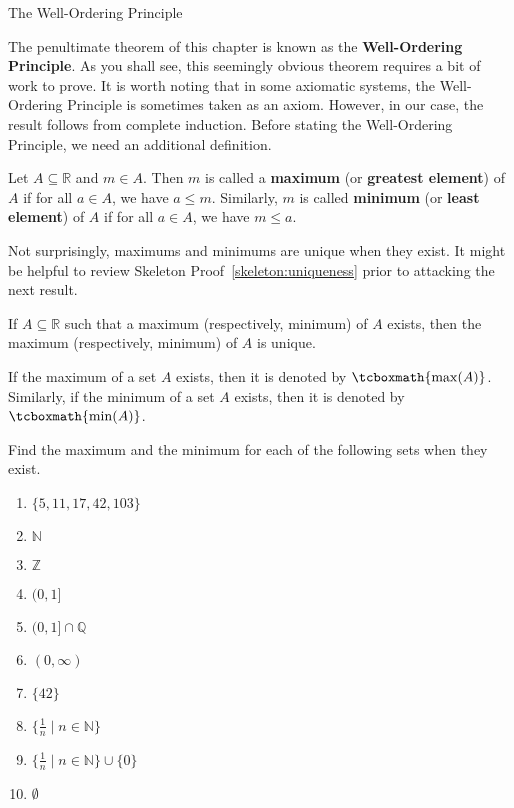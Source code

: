 \begin{section}{The Well-Ordering Principle}\label{sec:WOP}

The penultimate theorem of this chapter is known as the \textbf{Well-Ordering Principle}. As you shall see, this seemingly obvious theorem requires a bit of work to prove. It is worth noting that in some axiomatic systems, the Well-Ordering Principle is sometimes taken as an axiom.  However, in our case, the result follows from complete induction. Before stating the Well-Ordering Principle, we need an additional definition.

\begin{definition}
Let $A\subseteq \mathbb{R}$ and $m\in A$. Then $m$ is called a \textbf{maximum} (or \textbf{greatest element}) of $A$ if for all $a\in A$, we have $a\leq m$. Similarly, $m$ is called \textbf{minimum} (or \textbf{least element}) of $A$ if for all $a\in A$, we have $m\leq a$.
\end{definition}

Not surprisingly, maximums and minimums are unique when they exist. It might be helpful to review Skeleton Proof~\ref{skeleton:uniqueness} prior to attacking the next result.

\begin{theorem}
If $A\subseteq \mathbb{R}$ such that a maximum (respectively, minimum) of $A$ exists, then the maximum (respectively, minimum) of $A$ is unique.
\end{theorem}

If the maximum of a set $A$ exists, then it is denoted by $\tcboxmath{\max(A)}$. Similarly, if the minimum of a set $A$ exists, then it is denoted by $\tcboxmath{\min(A)}$.

\begin{problem}\label{prob:find max and min}
Find the maximum and the minimum for each of the following sets when they exist.
\begin{enumerate}[label=\textrm{(\alph*)}]
\item $\{5,11,17,42,103\}$ 
\item $\mathbb{N}$
\item $\mathbb{Z}$
\item $(0,1]$
\item $(0,1]\cap \mathbb{Q}$
\item $(0,\infty)$
\item $\{42\}$
\item $\{\frac{1}{n}\mid n\in\mathbb{N}\}$
\item $\{\frac{1}{n}\mid n\in\mathbb{N}\}\cup\{0\}$
\item $\emptyset$
\end{enumerate}
\end{problem}


\end{section}
